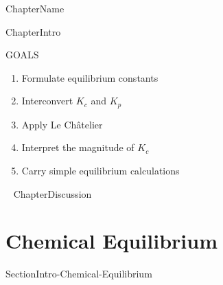 \documentclass[main.tex]{subfiles}
\begin{document}
  
   {ChapterName}


      \begin{marginfigure}
\end{marginfigure}
   {ChapterIntro}




\begin{marginfigure}%
\begin{mytcbox}{GOALS}
\begin{enumerate}[label=\protect\circled{\color{white}\arabic*}]
\item Formulate equilibrium constants
\item Interconvert $K_c$ and $K_p$
\item Apply Le Ch\^{a}telier
\item Interpret the magnitude of $K_c$
\item Carry simple equilibrium calculations
\end{enumerate}
\end{mytcbox}
\vspace{1cm}
\begin{tcolorbox}[enhanced,colback=red!5!white,colframe=black!50!red,boxrule=1pt,
  arc=0pt,outer arc=0pt,drop heavy lifted shadow]
\faGears\ 
  {ChapterDiscussion}


\end{tcolorbox}
\end{marginfigure}%

\section{Chemical Equilibrium} {SectionIntro-Chemical-Equilibrium}
\end{document}
